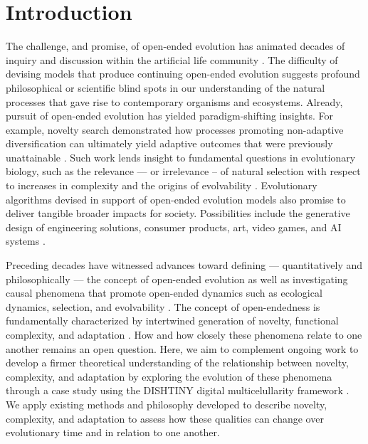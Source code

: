 \section{Introduction}

The challenge, and promise, of open-ended evolution has animated decades of inquiry and discussion within the artificial life community \citep{packard2019overview}.
The difficulty of devising models that produce continuing open-ended evolution suggests profound philosophical or scientific blind spots in our understanding of the natural processes that gave rise to contemporary organisms and ecosystems.
Already, pursuit of open-ended evolution has yielded paradigm-shifting insights.
For example, novelty search demonstrated how processes promoting non-adaptive diversification can ultimately yield adaptive outcomes that were previously unattainable \citep{lehman2011abandoning}.
Such work lends insight to fundamental questions in evolutionary biology, such as the relevance — or irrelevance – of natural selection with respect to increases in complexity \citep{lehman2012evolution, Lynch8597} and the origins of evolvability \citep{lehman2013evolvability,Kirschner8420}.
Evolutionary algorithms devised in support of open-ended evolution models also promise to deliver tangible broader impacts for society.
Possibilities include the generative design of engineering solutions, consumer products, art, video games, and AI systems \citep{nguyen2015,stanley2017open}.

Preceding decades have witnessed advances toward defining — quantitatively and philosophically — the concept of open-ended evolution \citep{lehman2012beyond,dolson2019modes,bedau1998classification} as well as investigating causal phenomena that promote open-ended dynamics such as ecological dynamics, selection, and evolvability \citep{dolson2019constructive,soros2014identifying,huizinga2018emergence}.
The concept of open-endedness is fundamentally characterized by intertwined generation of novelty, functional complexity, and adaptation \citep{taylor2016open}.
How and how closely these phenomena relate to one another remains an open question.
Here, we aim to complement ongoing work to develop a firmer theoretical understanding of the relationship between novelty, complexity, and adaptation by exploring the evolution of these phenomena through a case study using the DISHTINY digital multicelullarity framework \citep{moreno2019toward}.
We apply existing methods and philosophy developed to describe novelty, complexity, and adaptation to assess how these qualities can change over evolutionary time and in relation to one another.
